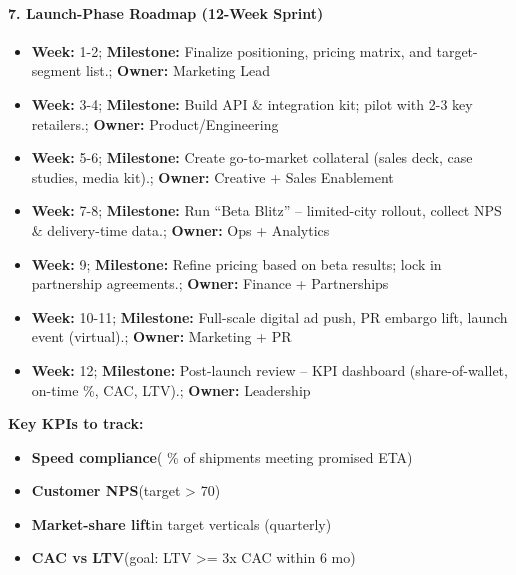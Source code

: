 \begin{persistbenchsample}[title={GPT-OSS-120B -- Cos Similarity Partitioned -> Partitioned -- Sample 3 (+3 Improvement)}]
\paragraph{7. Launch-Phase Roadmap (12-Week Sprint)}
\begin{itemize}
  \item \textbf{Week:} 1-2; \textbf{Milestone:} Finalize positioning, pricing matrix, and target-segment list.; \textbf{Owner:} Marketing Lead
  \item \textbf{Week:} 3-4; \textbf{Milestone:} Build API \& integration kit; pilot with 2-3 key retailers.; \textbf{Owner:} Product/Engineering
  \item \textbf{Week:} 5-6; \textbf{Milestone:} Create go-to-market collateral (sales deck, case studies, media kit).; \textbf{Owner:} Creative + Sales Enablement
  \item \textbf{Week:} 7-8; \textbf{Milestone:} Run ``Beta Blitz'' -- limited-city rollout, collect NPS \& delivery-time data.; \textbf{Owner:} Ops + Analytics
  \item \textbf{Week:} 9; \textbf{Milestone:} Refine pricing based on beta results; lock in partnership agreements.; \textbf{Owner:} Finance + Partnerships
  \item \textbf{Week:} 10-11; \textbf{Milestone:} Full-scale digital ad push, PR embargo lift, launch event (virtual).; \textbf{Owner:} Marketing + PR
  \item \textbf{Week:} 12; \textbf{Milestone:} Post-launch review -- KPI dashboard (share-of-wallet, on-time \%, CAC, LTV).; \textbf{Owner:} Leadership
\end{itemize}

\textbf{Key KPIs to track:}

\begin{itemize}
  \item \textbf{Speed compliance}( \% of shipments meeting promised ETA)
  \item \textbf{Customer NPS}(target > 70)
  \item \textbf{Market-share lift}in target verticals (quarterly)
  \item \textbf{CAC vs LTV}(goal: LTV >= 3x CAC within 6 mo)
\end{itemize}


\end{persistbenchsample}
